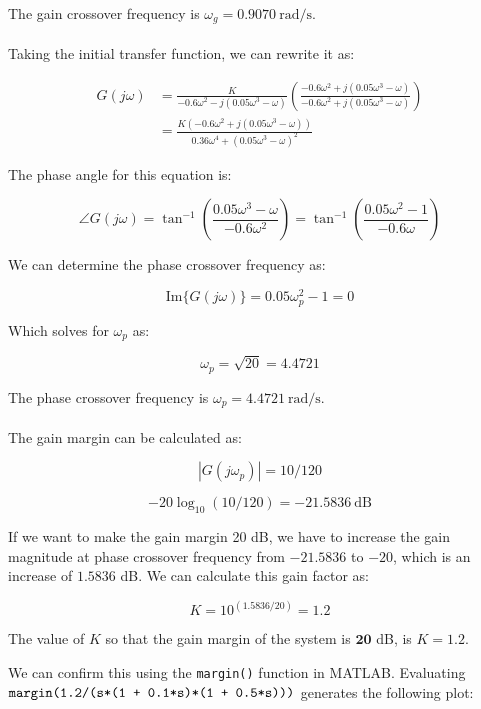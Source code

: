 \documentclass[12pt, letterpaper]{../assignment}
\begin{document}
The gain crossover frequency is $ \omega_g = 0.9070 \ \text{rad/s} $.
\\\\
Taking the initial transfer function, we can rewrite it as:

\begin{equation*}
\begin{aligned}
G(j\omega) &= \frac{K}{- 0.6 \omega ^2 - j(0.05\omega ^3 - \omega) }
        \left(\frac{- 0.6 \omega ^2 + j(0.05\omega ^3 - \omega)}
                   {- 0.6 \omega ^2 + j(0.05\omega ^3 - \omega)}\right)\\
           & = \frac{K(- 0.6 \omega ^2 + j(0.05\omega ^3 - \omega))}
                    { 0.36 \omega ^4 + (0.05\omega ^3 - \omega)^2 }
\end{aligned}
\end{equation*}

The phase angle for this equation is:

$$ \angle G(j\omega) = \tan^{-1} \left( \frac{0.05\omega ^3 - \omega}{- 0.6 \omega ^2} \right)
                     = \tan^{-1} \left( \frac{0.05\omega ^2 - 1}{- 0.6 \omega} \right) $$

We can determine the phase crossover frequency as:

$$ \text{Im}\{G(j\omega)\} = 0.05\omega_p ^2 - 1 = 0$$

Which solves for $\omega_p$ as:

$$ \omega_p = \sqrt{20} = 4.4721 $$

The phase crossover frequency is $ \omega_p =  4.4721 \ \text{rad/s} $.
\\\\
The gain margin can be calculated as:

$$ |G(j\omega_p)| = 10/120 $$

$$ -20 \log_{10} (10/120) = -21.5836 \ \text{dB} $$

If we want to make the gain margin 20 dB, we have to increase the gain magnitude at phase crossover frequency from $-21.5836$ to $-20$,
which is an increase of $1.5836$ dB.
We can calculate this gain factor as:

$$ K = 10^{(1.5836/20)} = 1.2 $$

\begin{answer}
The value of $K$ so that the gain margin of the system is $\mathbf{20}$ dB, is $K = 1.2$.
\end{answer}

We can confirm this using the \texttt{margin()} function in MATLAB.
Evaluating \\ $\texttt{\text{margin}(1.2/(s*(1 + 0.1*s)*(1 + 0.5*s)))}$ generates the following plot:
\end{document}
